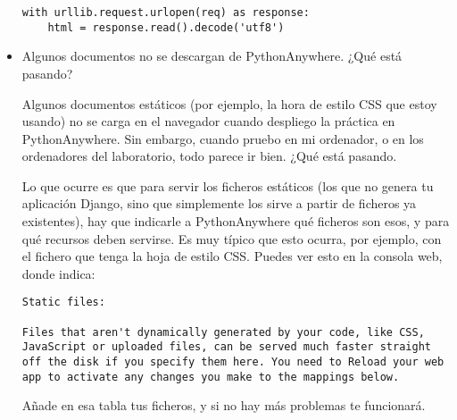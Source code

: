 \begin{itemize}
\begin{verbatim}
with urllib.request.urlopen(req) as response:
    html = response.read().decode('utf8')
\end{verbatim}

\item Algunos documentos no se descargan de PythonAnywhere. ¿Qué está pasando?

  Algunos documentos estáticos (por ejemplo, la hora de estilo CSS que estoy usando) no se carga en el navegador cuando despliego la práctica en PythonAnywhere. Sin embargo, cuando pruebo en mi ordenador, o en los ordenadores del laboratorio, todo parece ir bien. ¿Qué está pasando.

  Lo que ocurre es que para servir los ficheros estáticos (los que no genera tu aplicación Django, sino que simplemente los sirve a partir de ficheros ya existentes), hay que indicarle a PythonAnywhere qué ficheros son esos, y para qué recursos deben servirse. Es muy típico que esto ocurra, por ejemplo, con el fichero que tenga la hoja de estilo CSS. Puedes ver esto en la consola web, donde indica:

  \begin{verbatim}
Static files:

Files that aren't dynamically generated by your code, like CSS, JavaScript or uploaded files, can be served much faster straight off the disk if you specify them here. You need to Reload your web app to activate any changes you make to the mappings below.
\end{verbatim}

  Añade en esa tabla tus ficheros, y si no hay más problemas te funcionará.

\end{itemize}

